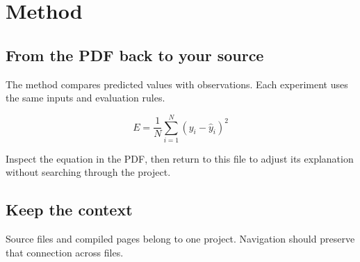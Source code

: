 \section{Method}

\subsection{From the PDF back to your source}
The method compares predicted values with observations.
Each experiment uses the same inputs and evaluation rules.

\begin{equation}
  E = \frac{1}{N}\sum_{i=1}^{N}(y_i - \hat{y}_i)^2
\end{equation}

Inspect the equation in the PDF, then return to this file
to adjust its explanation without searching through the project.

\subsection{Keep the context}
Source files and compiled pages belong to one project.
Navigation should preserve that connection across files.

